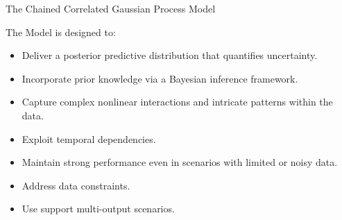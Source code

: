\documentclass[spanish, aspectratio=169]{beamer}
\begin{document}
\begin{frame}{The Chained Correlated Gaussian Process Model}
	\begin{block}{}
		The Model is designed to:
		\begin{itemize}
			\item Deliver a posterior predictive distribution that quantifies uncertainty.
			\item Incorporate prior knowledge via a Bayesian inference framework.
			\item Capture complex nonlinear interactions and intricate patterns within the data.
			\item Exploit temporal dependencies.
			\item Maintain strong performance even in scenarios with limited or noisy data.
			\item Address data constraints.
			\item Use support multi-output scenarios.
		\end{itemize}
	\end{block}
\end{frame}
\end{document}
